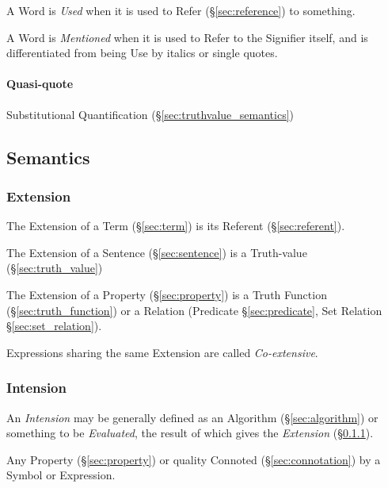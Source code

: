 A Word is \emph{Used} when it is used to Refer (\S\ref{sec:reference})
to something.

A Word is \emph{Mentioned} when it is used to Refer to the Signifier
itself, and is differentiated from being Use by italics or single
quotes.



\paragraph{Quasi-quote}\label{sec:quasi_quote}\hfill

Substitutional Quantification (\S\ref{sec:truthvalue_semantics})



\subsection{Semantics}\label{sec:semantics}

\subsubsection{Extension}\label{sec:extension}\cite{chalmers02}

The Extension of a Term (\S\ref{sec:term}) is its Referent
(\S\ref{sec:referent}).

The Extension of a Sentence (\S\ref{sec:sentence}) is a Truth-value
(\S\ref{sec:truth_value})

The Extension of a Property (\S\ref{sec:property}) is a Truth Function
(\S\ref{sec:truth_function}) or a Relation (Predicate
\S\ref{sec:predicate}, Set Relation \S\ref{sec:set_relation}).

Expressions sharing the same Extension are called \emph{Co-extensive}.



\subsubsection{Intension}\label{sec:intension}\cite{chalmers02}

An \emph{Intension} may be generally defined as an Algorithm
(\S\ref{sec:algorithm}) or something to be \emph{Evaluated}, the result of which
gives the \emph{Extension} (\S\ref{sec:extension}).

Any Property (\S\ref{sec:property}) or quality Connoted
(\S\ref{sec:connotation}) by a Symbol or Expression.


